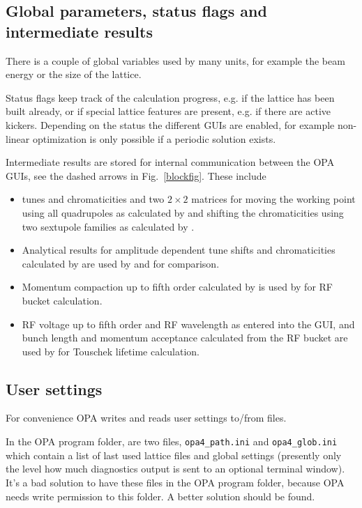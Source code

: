 \documentclass[12pt]{article}
\newcommand\code[1]{{\tt #1}}
\newcommand{\opagui}[1]{\colorbox{blue!20}{{\color{black}\code{#1}}}}
\newcommand{\ogui}[1]{\hyperref[#1]{\opagui{#1}}}
\newcommand{\todo}[1]{{\color{red} #1}}
\begin{document}
\subsection{Global parameters, status flags and intermediate results}
There is a couple of global variables used by many units, for example the beam energy or the size of the lattice.

Status flags keep track of the calculation progress, e.g. if the lattice has been built already, or if special lattice features are present, e.g. if there are active kickers. Depending on the status the different GUIs are enabled, for example non-linear optimization is only possible if a periodic solution exists. 

Intermediate results are stored for internal communication between the OPA GUIs, see the dashed arrows in Fig.~\ref{blockfig}. These include
\begin{itemize}
\item tunes and chromaticities and two $2\times 2$ matrices for moving the working point using all quadrupoles as calculated by \ogui{otunematrix} and shifting the chromaticities using two sextupole families as calculated by \ogui{opachroma}.
\item Analytical results for amplitude dependent tune shifts and chromaticities calculated by \ogui{opachroma} are used by \ogui{opamomentum} and \ogui{opatrackps} for comparison.
\item Momentum compaction up to fifth order calculated by \ogui{opamomentum} is used by \ogui{opabucket} for RF bucket calculation.
\item RF voltage up to fifth order and RF wavelength as entered into the \ogui{opabucket} GUI, and bunch length and momentum acceptance calculated from the RF bucket are used by \ogui{opatracktt} for Touschek lifetime calculation. 
\end{itemize}

\subsection{User settings}
For convenience OPA writes and reads user settings to/from files. 

In the OPA program folder, are two files, \code{opa4\_path.ini} and \code{opa4\_glob.ini} which contain a list of last used lattice files and global settings (presently only the level how much diagnostics output is sent to an optional terminal window). \todo{It's a bad solution to have these files in the OPA program folder, because OPA needs write permission to this folder. A better solution should be found.}
\end{document}
